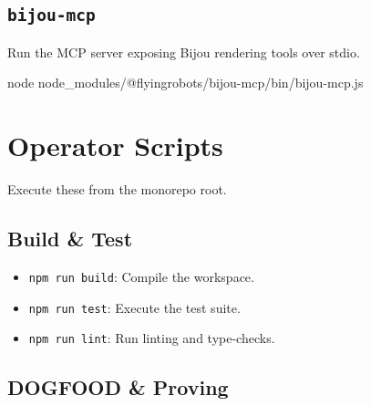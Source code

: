\subsection{\texorpdfstring{\texttt{b\allowbreak{}i\allowbreak{}j\allowbreak{}o\allowbreak{}u\allowbreak{}-\allowbreak{}m\allowbreak{}c\allowbreak{}p}}{}}\label{record-004-bijou-mcp}

Run the MCP server exposing Bijou rendering tools over stdio.

\begin{CodeBlock}
node node_modules/@flyingrobots/bijou-mcp/bin/bijou-mcp.js
\end{CodeBlock}

\section{Operator Scripts}\label{record-004-operator-scripts}

Execute these from the monorepo root.

\subsection{Build \& Test}\label{record-004-build-test}

\begin{itemize}
\tightlist
\item
  \texttt{n\allowbreak{}p\allowbreak{}m\allowbreak{} \allowbreak{}r\allowbreak{}u\allowbreak{}n\allowbreak{} \allowbreak{}b\allowbreak{}u\allowbreak{}i\allowbreak{}l\allowbreak{}d}: Compile the workspace.
\item
  \texttt{n\allowbreak{}p\allowbreak{}m\allowbreak{} \allowbreak{}r\allowbreak{}u\allowbreak{}n\allowbreak{} \allowbreak{}t\allowbreak{}e\allowbreak{}s\allowbreak{}t}: Execute the test suite.
\item
  \texttt{n\allowbreak{}p\allowbreak{}m\allowbreak{} \allowbreak{}r\allowbreak{}u\allowbreak{}n\allowbreak{} \allowbreak{}l\allowbreak{}i\allowbreak{}n\allowbreak{}t}: Run linting and type-checks.
\end{itemize}

\subsection{DOGFOOD \& Proving}\label{record-004-dogfood-proving}


